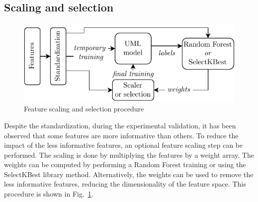 \subsection{Scaling and selection}
\begin{figure}
    \includegraphics[width=\linewidth]{images/Feat_scaling.pdf}
    \caption{Feature scaling and selection procedure}
    \label{fig:feature_scaling}
\end{figure}
Despite the standardization, during the experimental validation, it has been observed that some features are more informative than others. To reduce the impact of the less informative features, an optional feature scaling step can be performed. The scaling is done by multiplying the features by a weight array. The weights can be computed by performing a Random Forest training or using the SelectKBest library method. Alternatively, the weights can be used to remove the less informative features, reducing the dimensionality of the feature space. This procedure is shown in Fig.~\ref{fig:feature_scaling}.